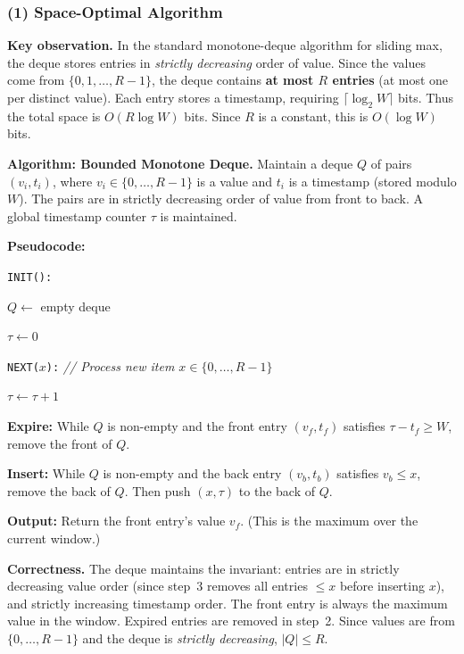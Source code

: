 \documentclass[11pt]{article}
\begin{document}
\subsubsection*{(1) Space-Optimal Algorithm}

\textbf{Key observation.}
In the standard monotone-deque algorithm for sliding max, the deque stores entries in \emph{strictly decreasing} order of value. Since the values come from $\{0, 1, \ldots, R-1\}$, the deque contains \textbf{at most $R$ entries} (at most one per distinct value). Each entry stores a timestamp, requiring $\lceil \log_2 W \rceil$ bits. Thus the total space is $O(R \log W)$ bits. Since $R$ is a constant, this is $O(\log W)$ bits.

\textbf{Algorithm: Bounded Monotone Deque.}
Maintain a deque $Q$ of pairs $(v_i, t_i)$, where $v_i \in \{0,\ldots,R-1\}$ is a value and $t_i$ is a timestamp (stored modulo $W$). The pairs are in strictly decreasing order of value from front to back. A global timestamp counter $\tau$ is maintained.

\bigskip
\noindent\textbf{Pseudocode:}

\noindent\texttt{INIT():}
\begin{compactitem}
\item $Q \leftarrow$ empty deque
\item $\tau \leftarrow 0$
\end{compactitem}

\noindent\texttt{NEXT($x$):} \quad \textit{// Process new item $x \in \{0,\ldots,R-1\}$}
\begin{compactenum}
\item $\tau \leftarrow \tau + 1$
\item \textbf{Expire:} While $Q$ is non-empty and the front entry $(v_f, t_f)$ satisfies $\tau - t_f \geq W$, remove the front of $Q$.
\item \textbf{Insert:} While $Q$ is non-empty and the back entry $(v_b, t_b)$ satisfies $v_b \leq x$, remove the back of $Q$. Then push $(x, \tau)$ to the back of $Q$.
\item \textbf{Output:} Return the front entry's value $v_f$. (This is the maximum over the current window.)
\end{compactenum}

\textbf{Correctness.}
The deque maintains the invariant: entries are in strictly decreasing value order (since step~3 removes all entries $\leq x$ before inserting $x$), and strictly increasing timestamp order. The front entry is always the maximum value in the window. Expired entries are removed in step~2. Since values are from $\{0,\ldots,R-1\}$ and the deque is \emph{strictly decreasing}, $|Q| \leq R$.
\end{document}
